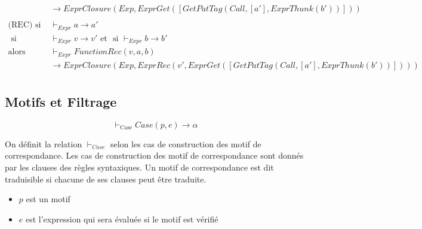 \documentclass[
  12pt,
]{article}
\providecommand{\tightlist}{%
  \setlength{\itemsep}{0pt}\setlength{\parskip}{0pt}}
\begin{document}
\begin{align*}
                               & \rightarrow  ExprClosure(Exp, ExprGet([GetPatTag(Call, [a'], ExprThunk(b'))]))                                          \\
  \\
  \text{(REC)}
  \text{ si }                  & \vdash_{Expr} a \rightarrow  a'                                                                                         \\
  \text{ si }                  & \vdash_{Expr} v \rightarrow  v' \text{ et } \text{ si }  \vdash_{Expr} b \rightarrow  b'                                \\
  \text{alors}                 & \vdash_{Expr} FunctionRec(v, a, b)                                                                                      \\
                               & \rightarrow  ExprClosure(Exp,ExprRec(v',ExprGet([GetPatTag(Call, [a'], ExprThunk(b'))])))                               \\
\end{align*}

\hypertarget{motifs-et-filtrage}{%
  \subsection{Motifs et Filtrage}\label{motifs-et-filtrage}}

\[ \vdash_{\text{Case}} Case(p,e) \rightarrow \alpha \]

On définit la relation \(\vdash_{Case}\) selon les cas de construction
des motif de correspondance. Les cas de construction des motif de
correspondance sont donnés par les clauses des règles syntaxiques. Un
motif de correspondance est dit traduisible si chacune de ses clauses
peut être traduite.

\begin{itemize}
  \tightlist
  \item
        \(p\) est un motif
  \item
        \(e\) est l'expression qui sera évaluée si le motif est vérifié
\end{itemize}
\end{document}
